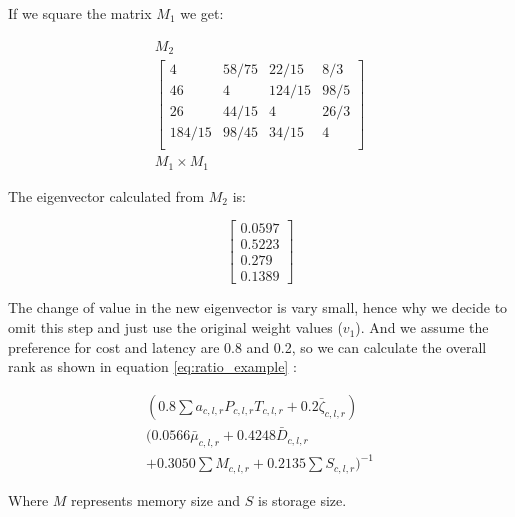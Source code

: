 \documentclass[journal]{IEEEtran}
\begin{document}
If we square the matrix $M_1$ we get:


\begin{equation}
\label{eq:m1square}
\begin{array}{c}
    M_2\\
    \begin{bmatrix}
        4      & 58/75 & 22/15  & 8/3 \\
        46     & 4     & 124/15 & 98/5 \\
        26     & 44/15 & 4      & 26/3 \\
        184/15 & 98/45 & 34/15  & 4\\
    \end{bmatrix}\\
    M_1 \times M_1
\end{array}
\end{equation}

The eigenvector calculated from $M_2$ is:


\begin{equation}
\label{eigenvector2}
\left[ 
\begin{array}{c} 
0.0597 \\ 
0.5223 \\
0.279 \\
0.1389
\end{array} 
\right] 
\end{equation}


The change of value in the new eigenvector is vary small, hence why we decide to omit this step and just use the original weight values ($v_1$). And we assume the preference for cost and latency are 0.8 and 0.2, so we can calculate the overall rank as shown in equation \ref{eq:ratio_example} : 


\begin{multline}\label{eq:ratio_example}
( 0.8 \sum { a_{c,l,r} P_{c,l,r} T_{c,l,r} } + 0.2 \bar\zeta_{c,l,r} ) \\ 
( 0.0566 \bar\mu_{c,l,r} + 0.4248\bar D_{c,l,r} \\ 
+ 0.3050 \sum M_{c,l,r} + 0.2135 \sum S_{c,l,r} )^{-1} 
\end{multline}

Where $M$ represents memory size and $S$ is storage size.
\end{document}

